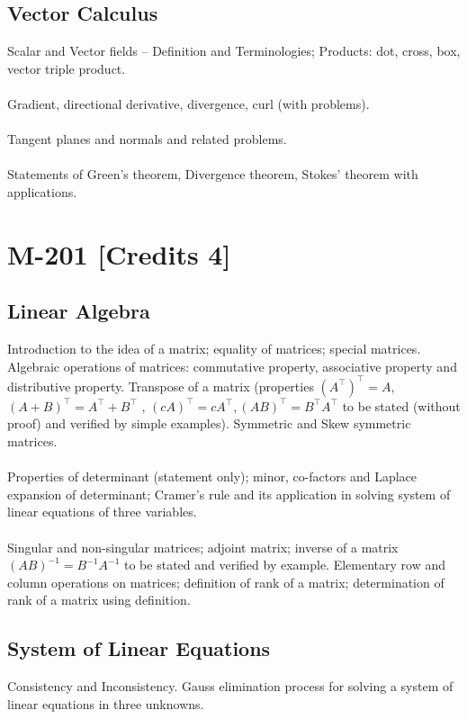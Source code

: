 \documentclass[12pt]{article}
\begin{document}
\subsection{Vector Calculus}
Scalar and Vector fields – Definition and Terminologies; Products: dot, cross, box, vector triple product.\\ \\
Gradient, directional derivative, divergence, curl (with problems).\\ \\
Tangent planes and normals and related problems.\\ \\
Statements of Green’s theorem, Divergence theorem, Stokes’ theorem with applications.

\section{M-201 [Credits 4]}
\subsection{Linear Algebra}
Introduction to the idea of a matrix; equality of matrices; special matrices. Algebraic operations of matrices: commutative property, associative property and distributive property. Transpose of a matrix (properties $(A^\top)^\top = A$, $(A+B)^\top = A^\top + B^\top$ , $(cA)^\top = cA^\top, (AB)^\top = B^\top A^\top$ to be stated (without proof) and verified by simple examples). Symmetric and Skew symmetric matrices.\\ \\
Properties of determinant (statement only); minor, co-factors and Laplace expansion of determinant; Cramer's rule and its application in solving system of linear equations of three variables.\\ \\
Singular and non-singular matrices; adjoint matrix; inverse of a matrix $(AB)^{-1} = B^{-1}A^{-1}$ to be stated and verified by example. Elementary row and column operations on matrices; definition of rank of a matrix; determination of rank of a matrix using definition.
\subsection{System of Linear Equations}
Consistency and Inconsistency. Gauss elimination process for solving a system of linear equations in three unknowns.
\end{document}
